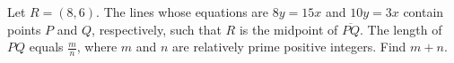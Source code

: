 Let $R=(8,6)$. The lines whose equations are $8y=15x$ and $10y=3x$ contain points $P$ and $Q$, respectively, such that $R$ is the midpoint of $\overline{PQ}$. The length of $PQ$ equals $\frac{m}{n}$, where $m$ and $n$ are relatively prime positive integers. Find $m+n$.